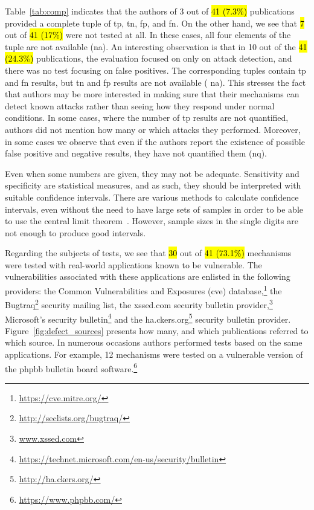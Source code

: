 \documentclass[10pt,journal,compsoc]{IEEEtran}
\newcommand{\hlc}[2][yellow]{ {\sethlcolor{#1} \hl{#2}} }
\begin{document}
Table~\ref{tab:comp} indicates that the authors of 3 out of \hlc[yellow]{41 (7.3\%)}
publications provided a complete tuple of {\sc tp}, {\sc tn}, 
{\sc fp}, and {\sc fn}. On the other hand, we
see that \hlc[yellow]{7} out of \hlc[yellow]{41 (17\%)} were not tested at all.
In these cases, all four elements of the tuple
are not available ({\sc na}). An interesting observation is
that in 10 out of the \hlc[yellow]{41 (24.3\%)}
publications, the evaluation focused on only on attack detection,
and there was no test focusing on false positives.
The corresponding tuples contain {\sc tp} and {\sc fn}
results, but {\sc tn} and {\sc fp} results are not available ({\sc
  na}). This stresses the fact that authors may be more interested in
making sure that their mechanisms can detect known attacks rather than
seeing how they respond under normal conditions. In some cases,
where the number of {\sc tp} results are not quantified, authors did
not mention how many or which attacks they performed. Moreover, in some
cases we observe that even if the authors report the existence of
possible false positive and negative results, they have not quantified
them ({\sc nq}).

Even when some numbers are given, they may not be adequate.
Sensitivity and specificity are statistical measures, and as such,
they should be interpreted with suitable confidence intervals. There are
various methods to calculate confidence intervals, even without
the need to have large sets of samples in order to be able to use the
central limit theorem~\cite{brown2001}.
However, sample sizes in the single
digits are not enough to produce good intervals.

Regarding the subjects of tests,
we see that \hlc[yellow]{30} out of \hlc[yellow]{41 (73.1\%)}
mechanisms were tested with real-world
applications known to be vulnerable.
The vulnerabilities associated with these applications
are enlisted in the following providers: the Common
Vulnerabilities and Exposures ({\sc cve})
database,\footnote{\scriptsize\url{https://cve.mitre.org/}}
the Bugtraq\footnote{\scriptsize\url{http://seclists.org/bugtraq/}}
security mailing list,
the {\sc xss}ed.com
security bulletin provider,\footnote{\scriptsize\url{www.xssed.com}}
Microsoft's security
bulletin\footnote{\scriptsize\url{https://technet.microsoft.com/en-us/security/bulletin}}
and the
ha.ckers.org\footnote{\scriptsize\url{http://ha.ckers.org/}}
security bulletin provider.
Figure~\ref{fig:defect_sources}
presents how many,
and which publications referred
to which source.
In numerous occasions authors performed tests based
on the same applications.
For example, 12 mechanisms were tested on a
vulnerable version of the {\sc phpbb} bulletin board
software.\footnote{\scriptsize\url{https://www.phpbb.com/}}
\end{document}
